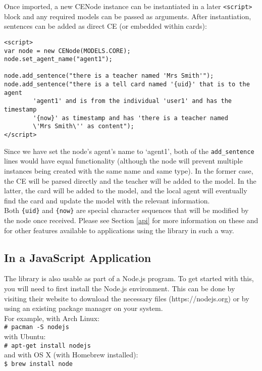 \documentclass{scrartcl}
\begin{document}
Once imported, a new CENode instance can be instantiated in a later \texttt{<script>} block and any required models can be passed as arguments. After instantiation, sentences can be added as direct CE (or embedded within cards):
\begin{verbatim}
<script>
var node = new CENode(MODELS.CORE);
node.set_agent_name("agent1");

node.add_sentence("there is a teacher named 'Mrs Smith'");
node.add_sentence("there is a tell card named '{uid}' that is to the agent 
        'agent1' and is from the individual 'user1' and has the timestamp 
        '{now}' as timestamp and has 'there is a teacher named 
        \'Mrs Smith\'' as content");
</script>
\end{verbatim}

Since we have set the node's agent's name to `agent1', both of the \texttt{add\_sentence} lines would have equal functionality (although the node will prevent multiple instances being created with the same name and same type). In the former case, the CE will be parsed directly and the teacher will be added to the model. In the latter, the card will be added to the model, and the local agent will eventually find the card and update the model with the relevant information.\\

Both \texttt{\{uid\}} and \texttt{\{now\}} are special character sequences that will be modified by the node once received. Please see Section \ref{api} for more information on these and for other features available to applications using the library in such a way.

\subsection{In a JavaScript Application}
\label{as_an_app}
The library is also usable as part of a Node.js program. To get started with this, you will need to first install the Node.js environment. This can be done by visiting their website to download the necessary files (https://nodejs.org) or by using an existing package manager on your system.\\
For example, with Arch Linux:\\
\texttt{\# pacman -S nodejs}\\
with Ubuntu:\\
\texttt{\# apt-get install nodejs}\\
and with OS X (with Homebrew installed):\\
\texttt{\$ brew install node}\\
\end{document}

